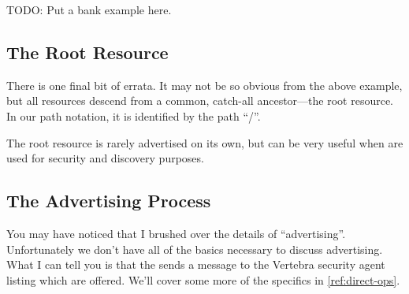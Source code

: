 TODO: Put a bank example here.

\subsection{The Root Resource}

There is one final bit of errata.  It may not be so obvious from the above example, but all resources descend from a common, catch-all ancestor---the {\sf root} resource.  In our path notation, it is identified by the path ``{\sf /}''.

The root resource is rarely advertised on its own, but can be very useful when \resources{} are used for security and discovery purposes.

\subsection{The Advertising Process}

You may have noticed that I brushed over the details of ``advertising''.  Unfortunately we don't have all of the basics necessary to discuss advertising.  What I can tell you is that the \agent{} sends a message to the Vertebra security agent listing which \resources{} are offered.  We'll cover some more of the specifics in \ref{ref:direct-ops}.


